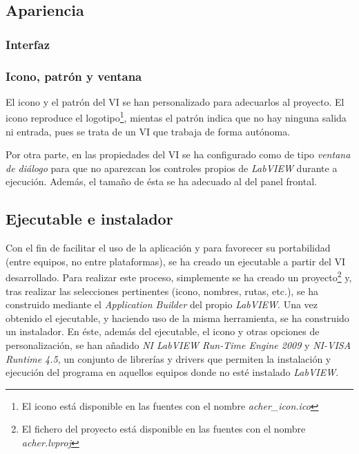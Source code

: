 \subsection{Apariencia}

\subsubsection{Interfaz}



\subsubsection{Icono, patrón y ventana}

El icono y el patrón del VI se han personalizado para adecuarlos al proyecto. El icono reproduce el logotipo\footnote{El icono está disponible en las fuentes con el nombre \textit{acher\_icon.ico}}, mientas el patrón indica que no hay ninguna salida ni entrada, pues se trata de un VI que trabaja de forma autónoma.

Por otra parte, en las propiedades del VI se ha configurado como de tipo \textit{ventana de diálogo} para que no aparezcan los controles propios de \textit{LabVIEW} durante a ejecución. Además, el tamaño de ésta se ha adecuado al del panel frontal.

\subsection{Ejecutable e instalador}

Con el fin de facilitar el uso de la aplicación y para favorecer su portabilidad (entre equipos, no entre plataformas), se ha creado un ejecutable a partir del VI desarrollado. Para realizar este proceso, simplemente se ha creado un proyecto\footnote{El fichero del proyecto está disponible en las fuentes con el nombre \textit{acher.lvproj}} y, tras realizar las selecciones pertinentes (icono, nombres, rutas, etc.), se ha construido mediante el \textit{Application Builder} del propio \textit{LabVIEW}. Una vez obtenido el ejecutable, y haciendo uso de la misma herramienta\cite{installer}, se ha construido un instalador. En éste, además del ejecutable, el icono y otras opciones de personalización, se han añadido \textit{NI LabVIEW Run-Time Engine 2009} y \textit{NI-VISA Runtime 4.5}, un conjunto de librerías y drivers que permiten la instalación y ejecución del programa en aquellos equipos donde no esté instalado \textit{LabVIEW}.

